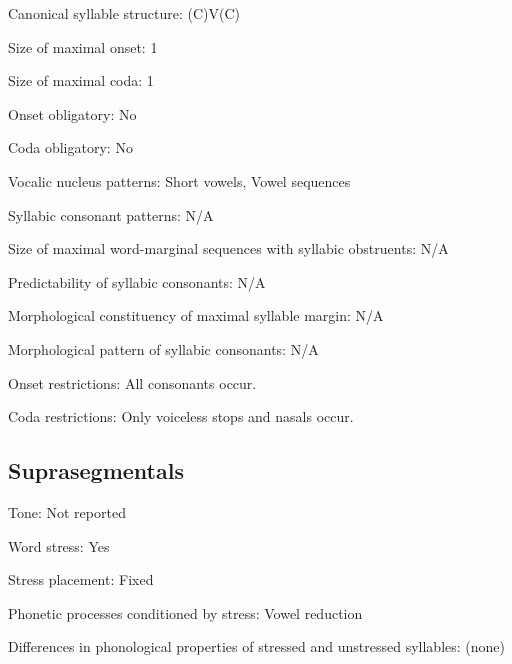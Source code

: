 {\begin{appendixdesc}
\item[Canonical syllable structure:] (C)V(C) \citep[14--18]{McElhanon1970}

\item[Size of maximal onset:] 1

\item[Size of maximal coda:] 1

\item[Onset obligatory:] No

\item[Coda obligatory:] No

\item[Vocalic nucleus patterns:] Short vowels, Vowel sequences

\item[Syllabic consonant patterns:] N/A

\item[Size of maximal word-marginal sequences with syllabic obstruents:] N/A

\item[Predictability of syllabic consonants:] N/A

\item[Morphological constituency of maximal syllable margin:] N/A

\item[Morphological pattern of syllabic consonants:] N/A

\item[Onset restrictions:] All consonants occur.

\item[Coda restrictions:] Only voiceless stops and nasals occur.
\end{appendixdesc}
\subsection*{Suprasegmentals}
\begin{appendixdesc}
\item[Tone:] Not reported

\item[Word stress:] Yes

\item[Stress placement:] Fixed

\item[Phonetic processes conditioned by stress:] Vowel reduction

\item[Differences in phonological properties of stressed and unstressed syllables:] (none)


\end{appendixdesc}}
